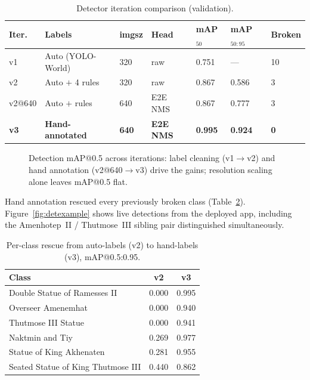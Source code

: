 \begin{table}[htbp]
\centering\small
\setlength{\tabcolsep}{5pt}
\caption{Detector iteration comparison (validation).}
\label{tab:iteration}
\begin{tabular}{@{}lllllll@{}}
\toprule
\textbf{Iter.} & \textbf{Labels} & \textbf{imgsz} & \textbf{Head} & \textbf{mAP$_{50}$} & \textbf{mAP$_{50:95}$} & \textbf{Broken}\\
\midrule
v1     & Auto (YOLO-World)       & 320 & raw     & 0.751 & ---   & 10\\
v2     & Auto $+$ 4 rules        & 320 & raw     & 0.867 & 0.586 & 3\\
v2@640 & Auto $+$ rules          & 640 & E2E NMS & 0.867 & 0.777 & 3\\
\textbf{v3} & \textbf{Hand-annotated} & \textbf{640} & \textbf{E2E NMS} & \textbf{0.995} & \textbf{0.924} & \textbf{0}\\
\bottomrule
\end{tabular}
\end{table}

\begin{figure}[htbp]
\centering
{}
\caption{Detection mAP@0.5 across iterations: label cleaning (v1$\rightarrow$v2) and
hand annotation (v2@640$\rightarrow$v3) drive the gains; resolution scaling alone leaves
mAP@0.5 flat.}
\label{fig:iteration}
\end{figure}

Hand annotation rescued every previously broken class
(Table~\ref{tab:rescue}). Figure~\ref{fig:detexample} shows live detections from the
deployed app, including the Amenhotep~II / Thutmose~III sibling pair distinguished
simultaneously.

\begin{table}[htbp]
\centering
\caption{Per-class rescue from auto-labels (v2) to hand-labels (v3), mAP@0.5:0.95.}
\label{tab:rescue}
\begin{tabular}{@{}lcc@{}}
\toprule
\textbf{Class} & \textbf{v2} & \textbf{v3}\\
\midrule
Double Statue of Ramesses II        & 0.000 & 0.995\\
Overseer Amenemhat                  & 0.000 & 0.940\\
Thutmose III Statue                 & 0.000 & 0.941\\
Naktmin and Tiy                     & 0.269 & 0.977\\
Statue of King Akhenaten            & 0.281 & 0.955\\
Seated Statue of King Thutmose III  & 0.440 & 0.862\\
\bottomrule
\end{tabular}
\end{table}

